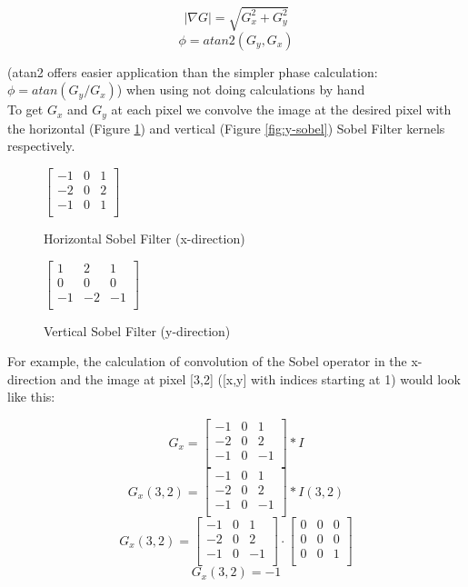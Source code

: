 \documentclass[12pt, letterpaper]{article}
\begin{document}
\[ |\nabla G| = \sqrt{G_x^2 + G_y^2} \]
\[ \phi = atan2(G_y, G_x) \]

\noindent (atan2 offers easier application than the simpler phase calculation: $\phi = atan(G_y/G_x)$) when using not doing calculations by hand\\

\noindent To get $G_x$ and $G_y$ at each pixel we convolve the image at the desired pixel with the horizontal (Figure \ref{fig:x-sobel}) and vertical (Figure \ref{fig:y-sobel}) Sobel Filter kernels respectively.\\

\begin{figure}[H]
    \centering
    $\begin{bmatrix}
    -1&0&1\\
    -2&0&2\\
    -1&0&1\\
    \end{bmatrix}$
    \caption{Horizontal Sobel Filter (x-direction)}
    \label{fig:x-sobel}
\end{figure}

\begin{figure}[H]
    \centering
    $\begin{bmatrix}
    1&2&1\\
    0&0&0\\
    -1&-2&-1\\
    \end{bmatrix}$
    \caption{Vertical Sobel Filter (y-direction)}
    \label{fig:q1}
\end{figure}

For example, the calculation of convolution of the Sobel operator in the x-direction and the image at pixel [3,2] ([x,y] with indices starting at 1) would look like this:

\[ G_x = \begin{bmatrix}-1&0&1\\-2&0&2\\-1&0&-1\\\end{bmatrix} * I \]
\[ G_x(3,2) = \begin{bmatrix}-1&0&1\\-2&0&2\\-1&0&-1\\\end{bmatrix} * I(3,2) \]
\[ G_x(3,2) = \begin{bmatrix}-1&0&1\\-2&0&2\\-1&0&-1\\\end{bmatrix} \cdot \begin{bmatrix}0&0&0\\0&0&0\\0&0&1\\\end{bmatrix} \]
\[ G_x(3,2) = -1 \]
\end{document}
